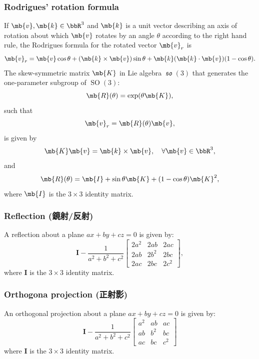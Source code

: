 \documentclass[a4paper,12pt]{report}
\begin{document}
\subsubsection{Rodrigues' rotation formula}
If $\mb{v},\mb{k}\in\bbR^3$ and $\mb{k}$ is a unit vector describing an axis of rotation about which $\mb{v}$ rotates by an angle $\theta$ according to the right hand rule, the Rodrigues formula for the rotated vector $\mb{v}_r$ is 
\[\mb{v}_r=\mb{v}\cos\theta+(\mb{k}\times\mb{v})\sin\theta+\mb{k}(\mb{k}\cdot\mb{v})(1-\cos\theta).\]
The skew-symmetric matrix $\mb{K}$ in Lie algebra $\operatorname{\mathfrak{so}}(3)$ that generates the one-parameter subgroup of $\operatorname{SO}(3)$:
\[\mb{R}(\theta)=\exp(\theta\mb{K}),\]
such that
\[\mb{v}_r=\mb{R}(\theta)\mb{v},\]
is given by
\[\mb{K}\mb{v}=\mb{k}\times\mb{v},\quad \forall \mb{v}\in\bbR^3,\]
and
\[\mb{R}(\theta)=\mb{I}+\sin\theta\mb{K}+(1-\cos\theta)\mb{K}^2,\]
where $\mb{I}$ is the $3\times 3$ identity matrix.
\subsubsection{Reflection (鏡射/反射)}
A reflection about a plane $ax+by+cz=0$ is given by:
\[\mathbf{I}-\frac{1}{a^2+b^2+c^2}\begin{bmatrix}
2a^2 & 2ab & 2ac \\
2ab & 2b^2 & 2bc \\
2ac & 2bc & 2c^2
\end{bmatrix},\]
where $\mathbf{I}$ is the $3\times 3$ identity matrix.
\subsubsection{Orthogona projection (正射影)}
An orthogonal projection about a plane $ax+by+cz=0$ is given by:
\[\mathbf{I}-\frac{1}{a^2 + b^2 + c^2}\begin{bmatrix}
a^2 & ab & ac \\
ab & b^2 & bc \\
ac & bc & c^2
\end{bmatrix}\]
where $\mathbf{I}$ is the $3\times 3$ identity matrix.
\end{document}

